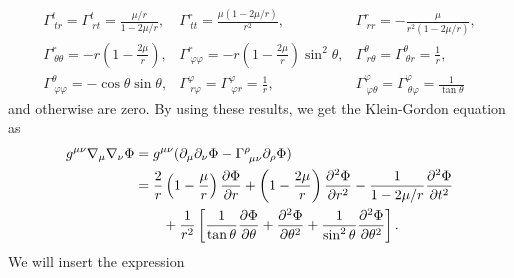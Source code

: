 \documentclass[a4paper,pdftex,10pt]{article}
\begin{document}
\begin{enumerate}
\begin{equation}
          \begin{array}{lll}
            \Gamma^{t}_{\ tr}
            =
            \Gamma^{t}_{\ rt}
            =
            \frac{\mu/r}{1-2\mu/r}
            ,
             &
            \Gamma^{r}_{\ tt}
            =
            \frac{\mu(1-2\mu/r)}{r^2}
            ,
             &
            \Gamma^{r}_{\ rr}
            =
            -\frac{\mu}{r^2(1-2\mu/r)}
            ,
            \\
            \Gamma^{r}_{\ \theta\theta}
            =
            -r\left( 1-\frac{2\mu}{r} \right)
            ,
             &
            \Gamma^{r}_{\ \varphi\varphi}
            =
            -r\left( 1-\frac{2\mu}{r} \right)\sin^2\theta
            ,
             &
            \Gamma^{\theta}_{\ r\theta}
            =
            \Gamma^{\theta}_{\ \theta r}
            =
            \frac{1}{r}
            ,
            \\
            \Gamma^{\theta}_{\ \varphi\varphi}
            =
            -\cos\theta\sin\theta
            ,
             &
            \Gamma^{\varphi}_{\ r\varphi}
            =
            \Gamma^{\varphi}_{\ \varphi r}
            =
            \frac{1}{r}
            ,
             &
            \Gamma^{\varphi}_{\ \varphi\theta}
            =
            \Gamma^{\varphi}_{\ \theta\varphi}
            =
            \frac{1}{\tan\theta}
          \end{array}
        \end{equation}
        and otherwise are zero. By using these results, we get the Klein-Gordon equation as
        \begin{align}
          g^{\mu\nu}\nabla_{\mu}\nabla_{\nu}
          \Phi
           & =
          g^{\mu\nu}
          (\partial_{\mu}\partial_{\nu}\Phi-\Gamma^{\rho}_{\ \mu\nu}\partial_{\rho}\Phi)
          \nonumber
          \\
           &
          =
          \frac{2}{r}\left( 1-\frac{\mu}{r} \right)\pdv{\Phi}{r}
          +
          \left( 1-\frac{2\mu}{r} \right)\pdv[2]{\Phi}{r}
          -
          \frac{1}{1-2\mu/r}\pdv[2]{\Phi}{t}
          \nonumber
          \\
           & \qquad
          +
          \frac{1}{r^2}
          \left[
            \frac{1}{\tan\theta}\pdv{\Phi}{\theta}
            +
            \pdv[2]{\Phi}{\theta}
            +
            \frac{1}{\sin^2\theta}\pdv[2]{\Phi}{\theta}
            \right]
          .
          \label{eqn:1.1}
        \end{align}
        We will insert the expression

\end{enumerate}
\end{document}
